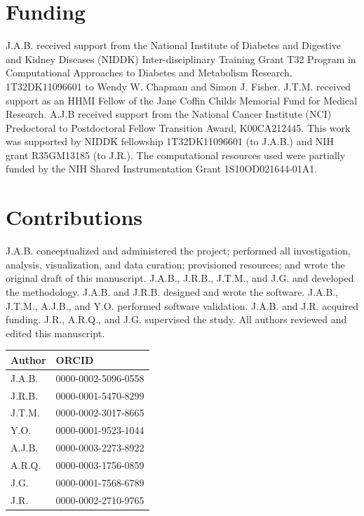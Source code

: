 \documentclass[10pt, oneside]{article}
\begin{document}
\section*{Funding}
J.A.B. received support from the National Institute of Diabetes and Digestive and Kidney Diseases (NIDDK) Inter-disciplinary Training Grant T32 Program in Computational Approaches to Diabetes and Metabolism Research, 1T32DK11096601 to Wendy W. Chapman and Simon J. Fisher. J.T.M. received support as an HHMI Fellow of the Jane Coffin Childs Memorial Fund for Medical Research. A.J.B received support from the National Cancer Institute (NCI) Predoctoral to Postdoctoral Fellow Transition Award, K00CA212445. This work was supported by NIDDK fellowship 1T32DK11096601 (to J.A.B.) and NIH grant R35GM13185 (to J.R.). The computational resources used were partially funded by the NIH Shared Instrumentation Grant 1S10OD021644-01A1.\\

\section*{Contributions}
J.A.B. conceptualized and administered the project; performed all investigation, analysis, visualization, and data curation; provisioned resources; and wrote the original draft of this manuscript. J.A.B., J.R.B., J.T.M., and J.G. and developed the methodology. J.A.B. and J.R.B. designed and wrote the software. J.A.B., J.T.M., A.J.B., and Y.O. performed software validation. J.A.B. and J.R. acquired funding. J.R., A.R.Q., and J.G. supervised the study. All authors reviewed and edited this manuscript.\\

\begin{table}[!]
    \centering
{}
\begin{tabular}{p{1.5cm}p{4cm}}
 \textbf{Author} & \textbf{ORCID}\\
 \hline
 J.A.B. & 0000-0002-5096-0558 \\
 \hline
 J.R.B. & 0000-0001-5470-8299 \\
 \hline
 J.T.M. & 0000-0002-3017-8665 \\
 \hline
 Y.O. & 0000-0001-9523-1044 \\
 \hline
 A.J.B. & 0000-0003-2273-8922 \\
 \hline
 A.R.Q. & 0000-0003-1756-0859 \\
 \hline
 J.G. & 0000-0001-7568-6789 \\
 \hline
 J.R. & 0000-0002-2710-9765 \\
\end{tabular}
\end{table}
\end{document}
